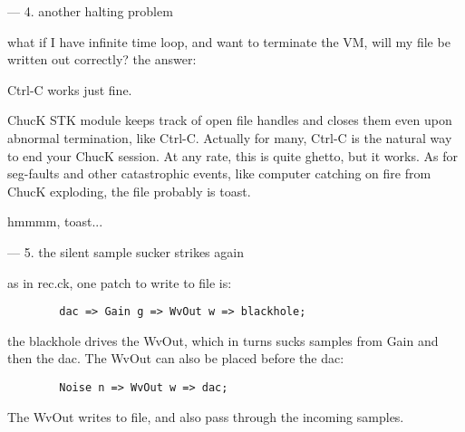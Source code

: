 ---
4. another halting problem

what if I have infinite time loop, and want to terminate
the VM, will my file be written out correctly?  the answer:

Ctrl-C works just fine.

ChucK STK module keeps track of open file handles and
closes them even upon abnormal termination, like Ctrl-C.
Actually for many, Ctrl-C is the natural way to end your
ChucK session.  At any rate, this is quite ghetto, but it works.
As for seg-faults and other catastrophic events, like computer
catching on fire from ChucK exploding, the file probably is
toast.

hmmmm, toast...


---
5. the silent sample sucker strikes again

as in rec.ck, one patch to write to file is:
\begin{verbatim}
        dac => Gain g => WvOut w => blackhole;
\end{verbatim}
the blackhole drives the WvOut, which in turns sucks
samples from Gain and then the dac.  The WvOut
can also be placed before the dac:
\begin{verbatim}
        Noise n => WvOut w => dac;
\end{verbatim}
The WvOut writes to file, and also pass through the incoming samples.
